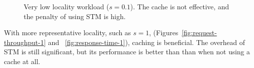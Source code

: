 \documentclass[preprint,11pt]{sigplanconf}
\begin{document}
\begin{figure}
 \centering
 \hfill
 \caption{Very low locality workload ($s = 0.1$). The cache is not effective,
 and the penalty of using STM is high.}
\end{figure}

With more representative locality, such as $s=1$, 
(Figures~\ref{fig:request-throughput-1} and ~\ref{fig:response-time-1}), 
caching is beneficial. The overhead
of STM is still significant, but its performance is better than
than when not using a cache at all. 
\end{document}
